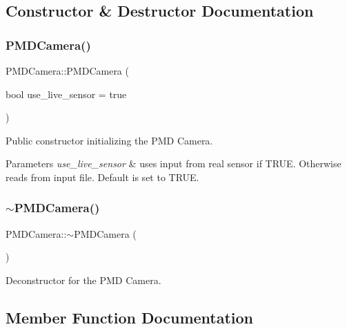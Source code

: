 \subsection{Constructor \& Destructor Documentation}
\hypertarget{class_p_m_d_camera_a9965c089ec7eea8537e249d432c1dbba}{}\label{class_p_m_d_camera_a9965c089ec7eea8537e249d432c1dbba} 
\subsubsection{\texorpdfstring{P\+M\+D\+Camera()}{PMDCamera()}}
{\footnotesize\ttfamily P\+M\+D\+Camera\+::\+P\+M\+D\+Camera (\begin{DoxyParamCaption}\item[{bool}]{use\+\_\+live\+\_\+sensor = {\ttfamily true} }\end{DoxyParamCaption})}



Public constructor initializing the P\+MD Camera. 


\begin{DoxyParams}{Parameters}
{\em use\+\_\+live\+\_\+sensor} & uses input from real sensor if T\+R\+UE. Otherwise reads from input file. Default is set to T\+R\+UE. \\
\hline
\end{DoxyParams}
\hypertarget{class_p_m_d_camera_a645cc6c2b05896c776bfdde5bc1aa1f0}{}\label{class_p_m_d_camera_a645cc6c2b05896c776bfdde5bc1aa1f0} 
\subsubsection{\texorpdfstring{$\sim$\+P\+M\+D\+Camera()}{~PMDCamera()}}
{\footnotesize\ttfamily P\+M\+D\+Camera\+::$\sim$\+P\+M\+D\+Camera (\begin{DoxyParamCaption}{ }\end{DoxyParamCaption})}



Deconstructor for the P\+MD Camera. 



\subsection{Member Function Documentation}
\hypertarget{class_p_m_d_camera_a13090aeffb98e1440e715a93e67d3c0e}{}\label{class_p_m_d_camera_a13090aeffb98e1440e715a93e67d3c0e} 
